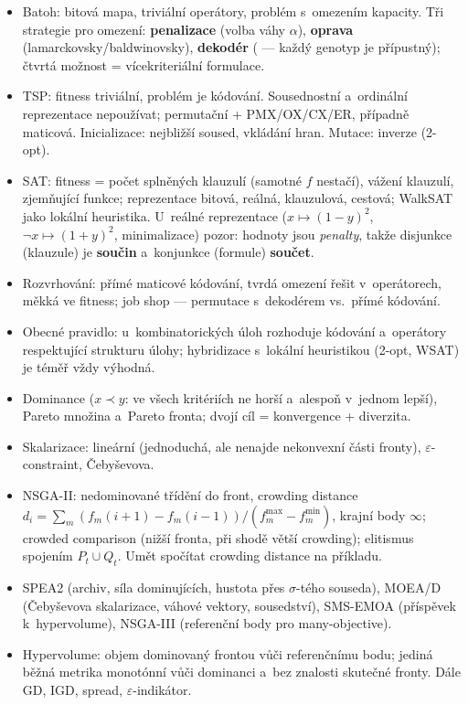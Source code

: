 \documentclass[11pt,a4paper]{article}
\theoremstyle{definition}
\begin{document}
\begin{itemize}
\item Batoh: bitová mapa, triviální operátory, problém s~omezením kapacity.
 Tři strategie pro omezení: \textbf{penalizace} (volba váhy $\alpha$),
 \textbf{oprava} (lamarckovsky/baldwinovsky), \textbf{dekodér}
 ( --- každý genotyp je přípustný);
 čtvrtá možnost = vícekriteriální formulace.
\item TSP: fitness triviální, problém je kódování. Sousednostní a~ordinální
 reprezentace nepoužívat; permutační + PMX/OX/CX/ER, případně maticová.
 Inicializace: nejbližší soused, vkládání hran. Mutace: inverze (2-opt).
\item SAT: fitness = počet splněných klauzulí (samotné $f$ nestačí),
 vážení klauzulí, zjemňující funkce; reprezentace bitová, reálná,
 klauzulová, cestová; WalkSAT jako lokální heuristika.
 U~reálné reprezentace ($x \mapsto (1-y)^2$, $\neg x \mapsto (1+y)^2$,
 minimalizace) pozor: hodnoty jsou \emph{penalty}, takže disjunkce
 (klauzule) je \textbf{součin} a~konjunkce (formule) \textbf{součet}.
\item Rozvrhování: přímé maticové kódování, tvrdá omezení řešit v~operátorech,
 měkká ve fitness; job shop --- permutace s~dekodérem vs.\ přímé kódování.
\item Obecné pravidlo: u~kombinatorických úloh rozhoduje kódování a~operátory
 respektující strukturu úlohy; hybridizace s~lokální heuristikou (2-opt,
 WSAT) je téměř vždy výhodná.
\item Dominance ($x \prec y$: ve všech kritériích ne horší a~alespoň v~jednom
 lepší), Pareto množina a~Pareto fronta; dvojí cíl = konvergence + diverzita.
\item Skalarizace: lineární (jednoduchá, ale nenajde nekonvexní části fronty),
 $\varepsilon$-constraint, Čebyševova.
\item NSGA-II: nedominované třídění do front, crowding distance
 $d_i = \sum_m (f_m(i+1)-f_m(i-1))/(f_m^{\max}-f_m^{\min})$, krajní body
 $\infty$; crowded comparison (nižší fronta, při shodě větší crowding);
 elitismus spojením $P_t \cup Q_t$. Umět spočítat crowding distance na
 příkladu.
\item SPEA2 (archiv, síla dominujících, hustota přes $\sigma$-tého souseda),
 MOEA/D (Čebyševova skalarizace, váhové vektory, sousedství),
 SMS-EMOA (příspěvek k~hypervolume), NSGA-III (referenční body pro
 many-objective).
\item Hypervolume: objem dominovaný frontou vůči referenčnímu bodu; jediná
 běžná metrika monotónní vůči dominanci a~bez znalosti skutečné fronty.
 Dále GD, IGD, spread, $\varepsilon$-indikátor.
\end{itemize}
\end{document}

